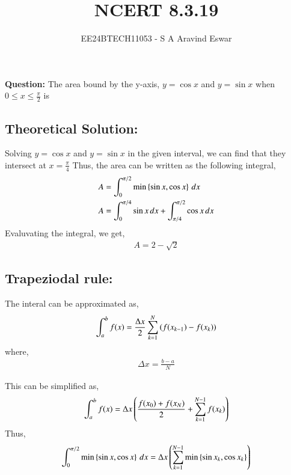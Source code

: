 \documentclass[journal]{IEEEtran}
\begin{document}

\vspace{3cm}

\title{NCERT 8.3.19}
\author{EE24BTECH11053 - S A Aravind Eswar}
{\let\newpage\relax\maketitle}

\renewcommand{\thefigure}{\theenumi}
\renewcommand{\thetable}{\theenumi}
\setlength{\intextsep}{10pt} %

\textbf{Question:} The area bound by the y-axis, $y=\cos{x}$ and $y=\sin{x}$ when $\displaystyle 0\leq x \leq \frac{\pi}{2}$ is

\subsection{Theoretical Solution:}
    Solving $y=\cos{x}$ and $y = \sin{x}$ in the given interval, we can find that they intersect at $x = \frac{\pi}{4}$
    Thus, the area can be written as the following integral,
    \begin{align}
        A &= \int_{0}^{\pi/2} \min\left\{\sin{x}, \cos{x}\right\}\, dx\\
        A &= \int_{0}^{\pi/4} \sin{x}\,dx + \int_{\pi/4}^{\pi/2} \cos{x}\,dx
    \end{align}
    Evaluvating the integral, we get,
    \begin{align}
        A = 2 - \sqrt{2}
    \end{align}

\subsection{Trapeziodal rule:}
    The interal can be approximated as,
    \begin{align}
        \int_{a}^{b} f(x) = \frac{\Delta x}{2} \sum_{k=1}^{N} \left(f(x_{k-1}) - f(x_k)\right)
    \end{align}
    where,
    \begin{align}
        \Delta x = \frac{b-a}{N}
    \end{align}

    This can be simplified as,
    \begin{align}
        \int_{a}^{b} f(x) = \Delta x\left(\frac{f(x_0) + f(x_N)}{2}+\sum_{k=1}^{N-1} f(x_k)\right)
    \end{align}
    Thus, 
    \begin{align}
        \int_{0}^{\pi/2} \min\left\{\sin{x},\cos{x}\right\}\,dx = \Delta x\left(\sum_{k=1}^{N-1}\min\left\{\sin{x_k},\cos{x_k}\right\}\right)
    \end{align}
    
\end{document}
